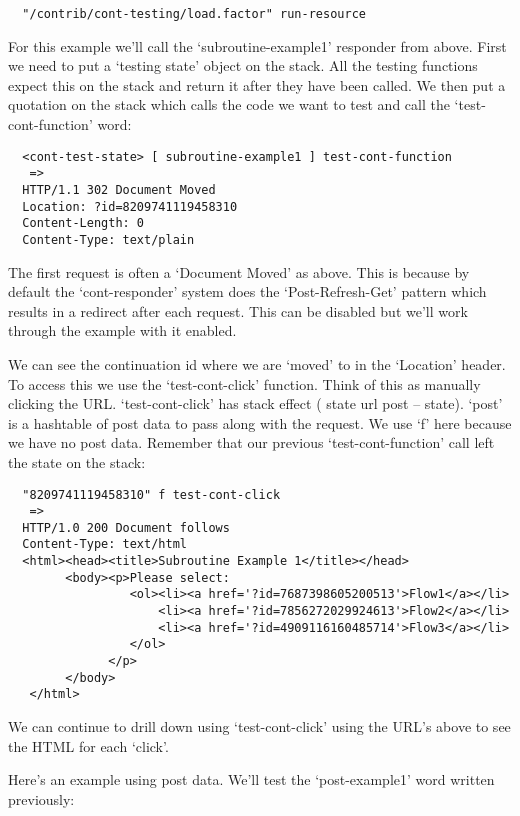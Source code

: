 \begin{verbatim}
  "/contrib/cont-testing/load.factor" run-resource
\end{verbatim}

For this example we'll call the `subroutine-example1' responder from
above. First we need to put a `testing state' object on the stack. All
the testing functions expect this on the stack and return it after
they have been called. We then put a quotation on the stack which
calls the code we want to test and call the `test-cont-function' word:

\begin{verbatim}
  <cont-test-state> [ subroutine-example1 ] test-cont-function
   => 
  HTTP/1.1 302 Document Moved
  Location: ?id=8209741119458310
  Content-Length: 0
  Content-Type: text/plain
\end{verbatim}

The first request is often a `Document Moved' as above. This is
because by default the `cont-responder' system does the
`Post-Refresh-Get' pattern which results in a redirect after each
request. This can be disabled but we'll work through the example with
it enabled.

We can see the continuation id where we are `moved' to in the
`Location' header. To access this we use the `test-cont-click'
function. Think of this as manually clicking the
URL. `test-cont-click' has stack effect 
( state url post -- state). `post' is a hashtable of post data to pass 
along with the request. We use `f' here because we have no post
data. Remember that our previous `test-cont-function' call left the
state on the stack:

\begin{verbatim}
  "8209741119458310" f test-cont-click
   =>
  HTTP/1.0 200 Document follows
  Content-Type: text/html
  <html><head><title>Subroutine Example 1</title></head>
        <body><p>Please select:
                 <ol><li><a href='?id=7687398605200513'>Flow1</a></li>
                     <li><a href='?id=7856272029924613'>Flow2</a></li>
                     <li><a href='?id=4909116160485714'>Flow3</a></li>
                 </ol>
              </p>
        </body>
   </html>
\end{verbatim}

We can continue to drill down using `test-cont-click' using the URL's
above to see the HTML for each `click'.

Here's an example using post data. We'll test the `post-example1' word
written previously:

